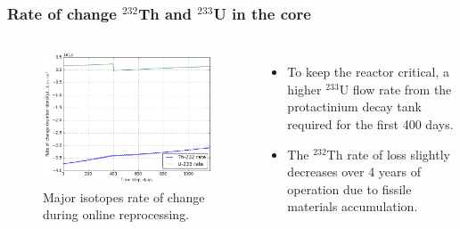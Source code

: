 \begin{frame}
  \frametitle{Rate of change $^{232}$Th and $^{233}$U in the core}
    \begin{columns}
    \column[t]{7.5cm}
   \vspace{-0.35in}
  \begin{figure}[t]
   \includegraphics[height=0.75\textheight]{./images/rates_fuel.png}
   \vspace{-0.05in}
   \caption{Major isotopes rate of change during online reprocessing.}
    \end{figure}

    \column[t]{4.5cm}
       \begin{itemize}
        \item To keep the reactor critical, a higher $^{233}$U flow rate from the protactinium decay tank required for
the first 400 days.
   		\item The $^{232}$Th rate of loss slightly decreases over 4 years of operation due to fissile materials accumulation.
       \end{itemize}
     \end{columns}
\end{frame}

